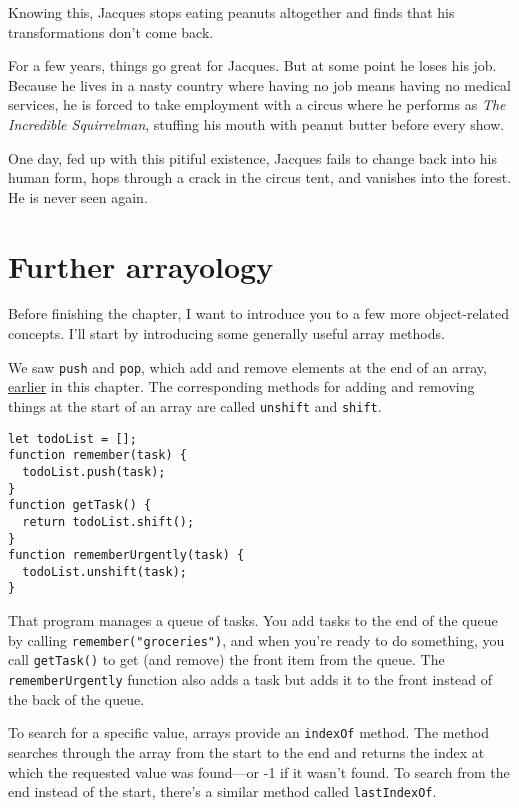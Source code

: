 Knowing this, Jacques stops eating peanuts altogether and finds that his transformations don't come back.

For a few years, things go great for Jacques. But at some point he loses his job. Because he lives in a nasty country where having no job means having no medical services, he is forced to take employment with a circus where he performs as \emph{The Incredible Squirrelman}, stuffing his mouth with peanut butter before every show.

One day, fed up with this pitiful existence, Jacques fails to change back into his human form, hops through a crack in the circus tent, and vanishes into the forest. He is never seen again.

\section{Further arrayology}

Before finishing the chapter, I want to introduce you to a few more object-related concepts. I'll start by introducing some generally useful array methods.

We saw \lstinline`push` and \lstinline`pop`, which add and remove elements at the end of an array, \hyperref[data.array_methods]{earlier} in this chapter. The corresponding methods for adding and removing things at the start of an array are called \lstinline`unshift` and \lstinline`shift`.

\begin{lstlisting}
let todoList = [];
function remember(task) {
  todoList.push(task);
}
function getTask() {
  return todoList.shift();
}
function rememberUrgently(task) {
  todoList.unshift(task);
}
\end{lstlisting}
\noindent{}

That program manages a queue of tasks. You add tasks to the end of the queue by calling \lstinline`remember("groceries")`, and when you're ready to do something, you call \lstinline`getTask()` to get (and remove) the front item from the queue. The \lstinline`rememberUrgently` function also adds a task but adds it to the front instead of the back of the queue.

To search for a specific value, arrays provide an \lstinline`indexOf` method. The method searches through the array from the start to the end and returns the index at which the requested value was found—or -1 if it wasn't found. To search from the end instead of the start, there's a similar method called \lstinline`lastIndexOf`.

